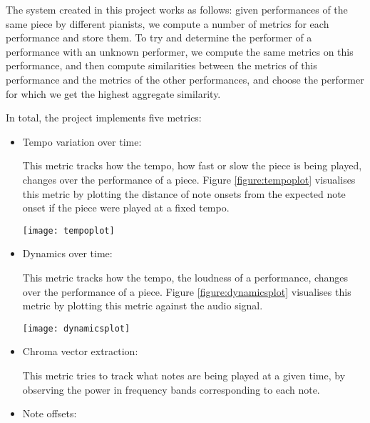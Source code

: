 \documentclass[oneside, class=book, crop=false, 12pt]{standalone}
\begin{document}
The system created in this project works as follows: given performances of the same piece by different pianists, we compute a number of metrics for each performance and store them. To try and determine the performer of a performance with an unknown performer, we compute the same metrics on this performance, and then compute similarities between the metrics of this performance and the metrics of the other performances, and choose the performer for which we get the highest aggregate similarity.

In total, the project implements five metrics:

\begin{itemize}
  \item
    Tempo variation over time:

    This metric tracks how the tempo, how fast or slow the piece is being played, changes over the performance of a piece. Figure \ref{figure:tempoplot} visualises this metric by plotting the distance of note onsets from the expected note onset if the piece were played at a fixed tempo.

\begin{minipage}{\textwidth}
  \centering
  \texttt{[image: tempoplot]}
  \label{figure:tempoplot}
\end{minipage}

  \item
    Dynamics over time:

    This metric tracks how the tempo, the loudness of a performance, changes over the performance of a piece. Figure \ref{figure:dynamicsplot} visualises this metric by plotting this metric against the audio signal.

\begin{minipage}{\textwidth}
  \centering
  \texttt{[image: dynamicsplot]}
  \label{figure:dynamicsplot}
\end{minipage}


  \item
    Chroma vector extraction:

    This metric tries to track what notes are being played at a given time, by observing the power in frequency bands corresponding to each note.

  \item
    Note offsets:


\end{itemize}
\end{document}
